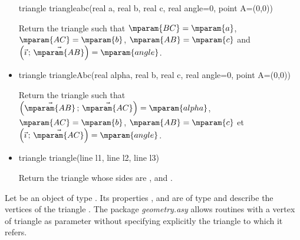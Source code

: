 \documentclass[pdftex]{article}
\newcommand{\Geo}{The package \emph{geometry.asy}\xspace}
\begin{document}
\begin{itemize}
  \begin{Vcolor}
    triangle triangleabc(real a, real b, real c, real angle=0, point A=(0,0))
  \end{Vcolor}
  Return the triangle  such that
  $\mparam{BC}=\mparam{a}$, $\mparam{AC}=\mparam{b}$,
  $\mparam{AB}=\mparam{c}$ and
  $\left(\vec{\imath}\,;\,\vec{\mparam{AB}}\right)=\mparam{angle}$.
\item {}
  \begin{Vcolor}
    triangle triangleAbc(real alpha, real b, real c, real angle=0, point A=(0,0))
  \end{Vcolor}
  Return the triangle  such that
  $\left(\vec{\mparam{AB}}\,;\,\vec{\mparam{AC}}\right)=\mparam{alpha}$, $\mparam{AC}=\mparam{b}$,
  $\mparam{AB}=\mparam{c}$ et $ \left(\vec{\imath}\,;\,\vec{\mparam{AC}}\right)=\mparam{angle}$.
\item {}
  \begin{Vcolor}
    triangle triangle(line l1, line l2, line l3)
  \end{Vcolor}
  Return the triangle whose sides are  , 
  and .
\end{itemize}


Let  be an object of type . Its
properties ,  and  are of type
 and describe the vertices of the
triangle . \Geo allows routines with a vertex of triangle as
parameter without specifying explicitly the triangle to which it refers.
\end{document}
